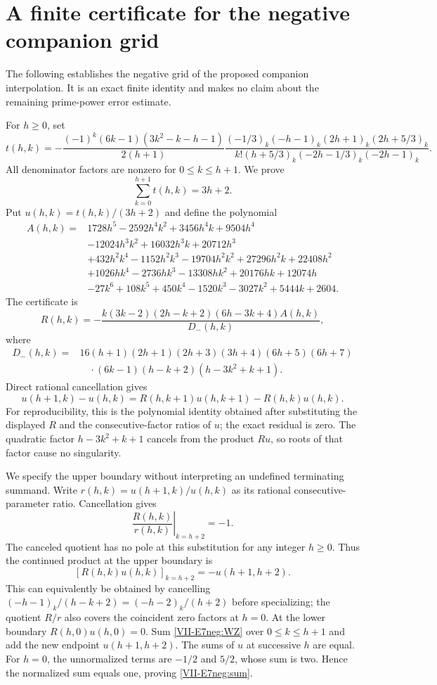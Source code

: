 \documentclass[11pt,letterpaper]{article}
\numberwithin{equation}{section}
\begin{document}
\section{A finite certificate for the negative companion grid}\label{loc-VII-B}
\label{VII-sec:E7negative}
The following establishes the negative grid of the proposed companion
interpolation. It is an exact finite identity and makes no claim about
the remaining prime-power error estimate.

For $h\ge0$, set
\[
 t(h,k)=-\frac{(-1)^k(6k-1)(3k^2-k-h-1)}{2(h+1)}
 \frac{(-1/3)_k(-h-1)_k(2h+1)_k(2h+5/3)_k}
 {k!(h+5/3)_k(-2h-1/3)_k(-2h-1)_k}.
\]
All denominator factors are nonzero for $0\le k\le h+1$.
We prove
\begin{equation}\label{VII-E7neg:sum}
 \sum_{k=0}^{h+1}t(h,k)=3h+2.
\end{equation}
Put $u(h,k)=t(h,k)/(3h+2)$ and define the polynomial
\[
\begin{split}
 A(h,k)={}&1728h^5-2592h^4k^2+3456h^4k+9504h^4\\
 &-12024h^3k^2+16032h^3k+20712h^3\\
 &+432h^2k^4-1152h^2k^3-19704h^2k^2+27296h^2k+22408h^2\\
 &+1026hk^4-2736hk^3-13308hk^2+20176hk+12074h\\
 &-27k^6+108k^5+450k^4-1520k^3-3027k^2+5444k+2604.
\end{split}
\]
The certificate is
\[
 R(h,k)=-\frac{k(3k-2)(2h-k+2)(6h-3k+4)A(h,k)}{D_-(h,k)},
\]
where
\begin{align*}
 D_-(h,k)={}&16(h+1)(2h+1)(2h+3)(3h+4)(6h+5)(6h+7)\\
 &\quad\cdot(6k-1)(h-k+2)(h-3k^2+k+1).
\end{align*}
Direct rational cancellation gives
\begin{equation}\label{VII-E7neg:WZ}
 u(h+1,k)-u(h,k)
 =R(h,k+1)u(h,k+1)-R(h,k)u(h,k).
\end{equation}
For reproducibility, this is the polynomial identity obtained after
substituting the displayed $R$ and the consecutive-factor ratios of
$u$; the exact residual is zero. The quadratic factor
$h-3k^2+k+1$ cancels from the product $Ru$, so roots of that factor
cause no singularity.

We specify the upper boundary without interpreting an undefined
terminating summand. Write $r(h,k)=u(h+1,k)/u(h,k)$ as its rational
consecutive-parameter ratio. Cancellation gives
\[
 \left.\frac{R(h,k)}{r(h,k)}\right|_{k=h+2}=-1.
\]
The canceled quotient has no pole at this substitution for any
integer $h\ge0$. Thus the continued product at the upper boundary is
\[
 [R(h,k)u(h,k)]_{k=h+2}=-u(h+1,h+2).
\]
This can equivalently be obtained by cancelling
$(-h-1)_k/(h-k+2)=(-h-2)_k/(h+2)$ before specializing; the quotient
$R/r$ also covers the coincident zero factors at $h=0$.
At the lower boundary $R(h,0)u(h,0)=0$.
Sum \eqref{VII-E7neg:WZ} over $0\le k\le h+1$ and add the new endpoint
$u(h+1,h+2)$. The sums of $u$ at successive $h$ are equal.
For $h=0$, the unnormalized terms are $-1/2$ and $5/2$, whose sum
is two. Hence the normalized sum equals one, proving
\eqref{VII-E7neg:sum}.
\end{document}
